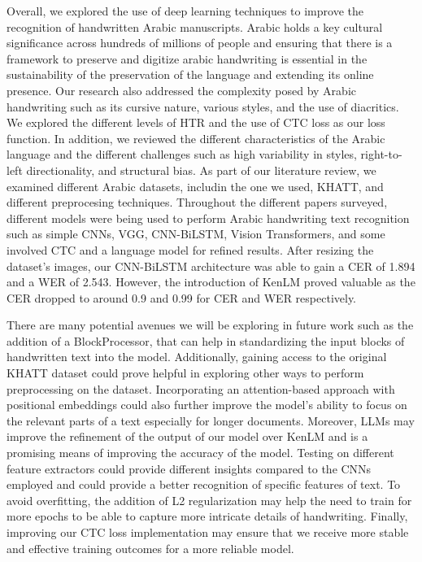 \documentclass[conference]{IEEEtran}
\begin{document}
Overall, we explored the use of deep learning techniques to improve the recognition of handwritten Arabic manuscripts. Arabic holds a key cultural significance across hundreds of millions of people and ensuring that there is a framework to preserve and digitize arabic handwriting is essential in the sustainability of the preservation of the language and extending its online presence. Our research also addressed the complexity posed by Arabic handwriting such as its cursive nature, various styles, and the use of diacritics. We explored the different levels of HTR and the use of CTC loss as our loss function. In addition, we reviewed the different characteristics of the Arabic language and the different challenges such as high variability in styles, right-to-left directionality, and structural bias. As part of our literature review, we examined different Arabic datasets, includin the one we used, KHATT, and different preprocesing techniques. Throughout the different papers surveyed, different models were being used to perform Arabic handwriting text recognition such as simple CNNs, VGG, CNN-BiLSTM, Vision Transformers, and some involved CTC and a language model for refined results. After resizing the dataset's images, our CNN-BiLSTM architecture was able to gain a CER of 1.894 and a WER of 2.543. However, the introduction of KenLM proved valuable as the CER dropped to around 0.9 and 0.99 for CER and WER respectively. 

There are many potential avenues we will be exploring in future work such as the addition of a BlockProcessor, that can help in standardizing the input blocks of handwritten text into the model. Additionally, gaining access to the original KHATT dataset could prove helpful in exploring other ways to perform preprocessing on the dataset. Incorporating an attention-based approach with positional embeddings could also further improve the model's ability to focus on the relevant parts of a text especially for longer documents. Moreover, LLMs may improve the refinement of the output of our model over KenLM and is a promising means of improving the accuracy of the model. Testing on different feature extractors could provide different insights compared to the CNNs employed and could provide a better recognition of specific features of text. To avoid overfitting, the addition of L2 regularization may help the need to train for more epochs to be able to capture more intricate details of handwriting. Finally, improving our CTC loss implementation may ensure that we receive more stable and effective training outcomes for a more reliable model. 





 

\end{document}
